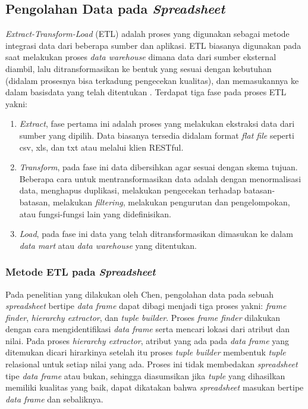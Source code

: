 \subsection{Pengolahan Data pada \textit{Spreadsheet}}
    \textit{Extract-Transform-Load} (ETL) adalah proses yang digunakan sebagai metode integrasi data dari beberapa sumber dan aplikasi. ETL biasanya digunakan pada saat melakukan proses \textit{data warehouse} dimana data dari sumber eksternal diambil, lalu ditransformasikan ke bentuk yang sesuai dengan kebutuhan (didalam prosesnya bisa terkadung pengecekan kualitas), dan memasukannya ke dalam basisdata yang telah ditentukan \parencite{Bansal2014}. Terdapat tiga fase pada proses ETL yakni:

    \begin{enumerate}
        \item \textit{Extract}, fase pertama ini adalah proses yang melakukan ekstraksi data dari sumber yang dipilih. Data biasanya tersedia didalam format \textit{flat file} seperti csv, xls, dan txt atau melalui klien RESTful.
        \item \textit{Transform}, pada fase ini data dibersihkan agar sesuai dengan skema tujuan. Beberapa cara untuk mentransformasikan data adalah dengan menormalisasi data, menghapus duplikasi, melakukan pengecekan terhadap batasan-batasan, melakukan \textit{filtering}, melakukan pengurutan dan pengelompokan, atau fungsi-fungsi lain yang didefinisikan.
        \item \textit{Load}, pada fase ini data yang telah ditransformasikan dimasukan ke dalam \textit{data mart} atau \textit{data warehouse} yang ditentukan.
    \end{enumerate}

    \subsubsection{Metode ETL pada \textit{Spreadsheet}} \label{metodepencarian}
    Pada penelitian yang dilakukan oleh Chen, pengolahan data pada sebuah \textit{spreadsheet} bertipe \textit{data frame} dapat dibagi menjadi tiga proses yakni: \textit{frame finder}, \textit{hierarchy extractor}, dan \textit{tuple builder}. Proses \textit{frame finder} dilakukan dengan cara mengidentifikasi \textit{data frame} serta mencari lokasi dari atribut dan nilai. Pada proses \textit{hierarchy extractor}, atribut yang ada pada \textit{data frame} yang ditemukan dicari hirarkinya setelah itu proses \textit{tuple builder} membentuk \textit{tuple} relasional untuk setiap nilai yang ada. Proses ini tidak membedakan \textit{spreadsheet} tipe \textit{data frame} atau bukan, sehingga diasumsikan jika \textit{tuple} yang dihasilkan memiliki kualitas yang baik, dapat dikatakan bahwa \textit{spreadsheet} masukan bertipe \textit{data frame} dan sebaliknya. \parencite{Chen2013}

